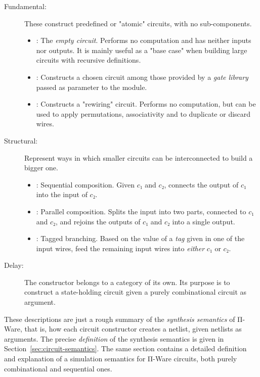         \begin{description}
            \item[Fundamental:] These construct predefined or "atomic" circuits, with no sub-components.
                \begin{itemize}
                    \item {}: The \emph{empty circuit}. Performs no computation and has neither inputs nor outputs.
                        It is mainly useful as a "base case" when building large circuits with recursive definitions.
                    \item {}: Constructs a chosen circuit among those provided by a \emph{gate library}
                        passed as parameter to the  module.
                    \item {}: Constructs a "rewiring" circuit. Performs no computation,
                        but can be used to apply permutations, associativity and to duplicate or discard wires.
                \end{itemize}
            \item[Structural:] Represent ways in which smaller circuits can be interconnected to build a bigger one.
                \begin{itemize}
                    \item {}: Sequential composition.
                        Given $c₁$ and $c₂$, connects the output of $c₁$ into the input of $c₂$.
                    \item {}: Parallel composition.
                        Splits the input into two parts, connected to $c₁$ and $c₂$,
                        and rejoins the outputs of $c₁$ and $c₂$ into a single output.
                    \item {}: Tagged branching.
                        Based on the value of a \emph{tag} given in one of the input wires,
                        feed the remaining input wires into \emph{either} $c₁$ or $c₂$.
                \end{itemize}
            \item[Delay:]
                The  constructor belongs to a category of its own.
                Its purpose is to construct a state-holding circuit given a purely combinational circuit as argument.
        \end{description}

        These descriptions are just a rough summary of the \emph{synthesis semantics} of Π-Ware, that is,
        how each circuit constructor creates a netlist, given netlists as arguments.
        The precise \emph{definition} of the synthesis semantics is given in Section~\ref{sec:circuit-semantics}.
        The same section contains a detailed definition and explanation of a simulation semantics
        for Π-Ware circuits, both purely combinational and sequential ones.

